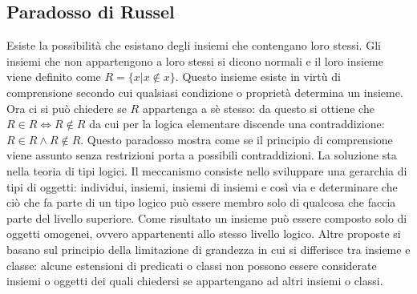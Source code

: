 \subsection{Paradosso di Russel}
Esiste la possibilit\`a che esistano degli insiemi che contengano loro stessi. Gli insiemi che non appartengono a loro stessi si dicono normali e il loro insieme viene definito come $R=\{x|x\not\in x\}$. Questo 
insieme esiste in virt\`u di comprensione secondo cui qualsiasi condizione o propriet\`a determina un insieme. Ora ci si pu\`o chiedere se $R$ appartenga a s\`e stesso: da questo si ottiene che $R\in 
R\Leftrightarrow R\not\in R$ da cui per la logica elementare discende una contraddizione: $R\in R\land R\not\in R$. Questo paradosso mostra come se il principio di comprensione viene assunto senza 
restrizioni porta a possibili contraddizioni. La soluzione sta nella teoria di tipi logici. Il meccanismo consiste nello sviluppare una gerarchia di tipi di oggetti: individui, insiemi, insiemi di insiemi e cos\`i via e 
determinare che ci\`o che fa parte di un tipo logico pu\`o essere membro solo di qualcosa che faccia parte del livello superiore. Come risultato un insieme pu\`o essere composto solo di oggetti omogenei, ovvero 
appartenenti allo stesso livello logico. Altre proposte si basano sul principio della limitazione di grandezza in cui si differisce tra insieme e classe: alcune estensioni di predicati o classi non possono essere 
considerate insiemi o oggetti dei quali chiedersi se appartengano ad altri insiemi o classi. 
